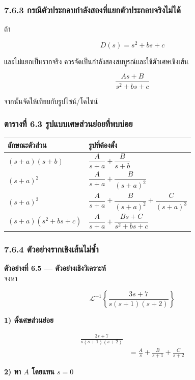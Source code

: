 \subsubsection{7.6.3 กรณีตัวประกอบกำลังสองที่แยกตัวประกอบจริงไม่ได้}

ถ้า

\[
D(s)=s^2+bs+c
\]

และไม่แยกเป็นรากจริง ควรจัดเป็นกำลังสองสมบูรณ์และใช้ตัวเศษเชิงเส้น

\[
\frac{As+B}{s^2+bs+c}
\]

จากนั้นจัดให้เทียบกับรูปไซน์/โคไซน์

\subsubsection{ตารางที่ 6.3 รูปแบบเศษส่วนย่อยที่พบบ่อย}

\begin{table}[htbp]
    \centering
    \begin{tabular}{l l}
        \hline
        \textbf{ลักษณะตัวส่วน} & \textbf{รูปที่ต้องตั้ง} \\
        \hline
        $(s+a)(s+b)$ & $\dfrac{A}{s+a}+\dfrac{B}{s+b}$ \\
        $(s+a)^2$ & $\dfrac{A}{s+a}+\dfrac{B}{(s+a)^2}$ \\
        $(s+a)^3$ & $\dfrac{A}{s+a}+\dfrac{B}{(s+a)^2}+\dfrac{C}{(s+a)^3}$ \\
        $(s+a)(s^2+bs+c)$ & $\dfrac{A}{s+a}+\dfrac{Bs+C}{s^2+bs+c}$ \\
        \hline
    \end{tabular}
\end{table}

\subsubsection{7.6.4 ตัวอย่างรากเชิงเส้นไม่ซ้ำ}

\textbf{ตัวอย่างที่ 6.5 — ตัวอย่างเชิงวิเคราะห์}\\
จงหา

\[
\mathcal{L}^{-1}\left\{\frac{3s+7}{s(s+1)(s+2)}\right\}
\]

\textbf{1) ตั้งเศษส่วนย่อย}

\[
\begin{aligned}
    \frac{3s+7}{s(s+1)(s+2)}&\\
    &=\frac{A}{s}+\frac{B}{s+1}+\frac{C}{s+2}
\end{aligned}
\]

\textbf{2) หา $A$ โดยแทน $s=0$}


